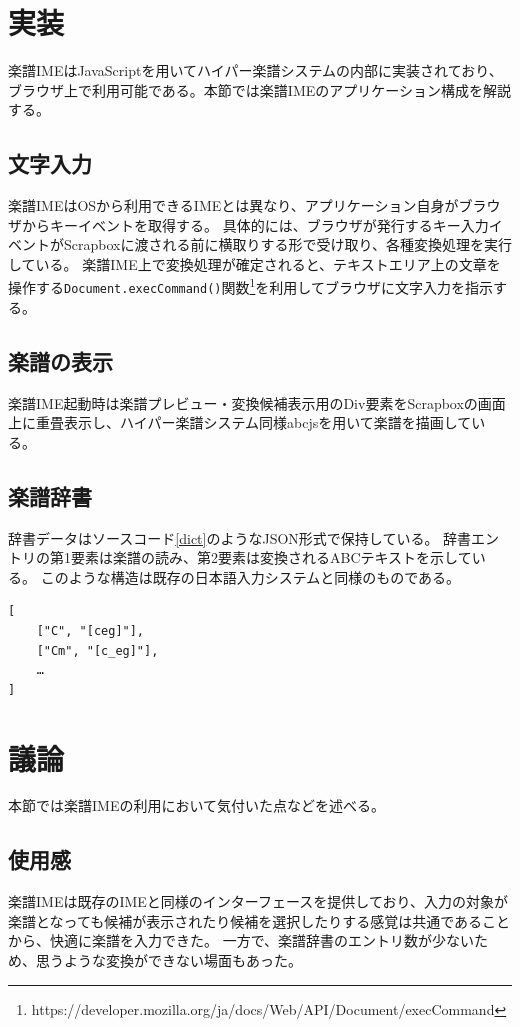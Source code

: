 \section{実装}
楽譜IMEはJavaScriptを用いてハイパー楽譜システムの内部に実装されており、ブラウザ上で利用可能である。本節では楽譜IMEのアプリケーション構成を解説する。

\subsection{文字入力}
楽譜IMEはOSから利用できるIMEとは異なり、アプリケーション自身がブラウザからキーイベントを取得する。
具体的には、ブラウザが発行するキー入力イベントがScrapboxに渡される前に横取りする形で受け取り、各種変換処理を実行している。
楽譜IME上で変換処理が確定されると、テキストエリア上の文章を操作する\texttt{Document.execCommand()}関数\footnote{\textsf{https://developer.mozilla.org/ja/docs/Web/API/Document/execCommand}}を利用してブラウザに文字入力を指示する。

\subsection{楽譜の表示}
楽譜IME起動時は楽譜プレビュー・変換候補表示用のDiv要素をScrapboxの画面上に重畳表示し、ハイパー楽譜システム同様abcjsを用いて楽譜を描画している。

\subsection{楽譜辞書}
辞書データはソースコード\ref{dict}のようなJSON形式で保持している。
辞書エントリの第1要素は楽譜の読み、第2要素は変換されるABCテキストを示している。
このような構造は既存の日本語入力システム\cite{Masui}と同様のものである。
\begin{lstlisting}[caption=楽譜IMEの辞書データ, label=dict]
[
    ["C", "[ceg]"],
    ["Cm", "[c_eg]"],
    …
]
\end{lstlisting}


\section{議論}
本節では楽譜IMEの利用において気付いた点などを述べる。
\subsection{使用感}
楽譜IMEは既存のIMEと同様のインターフェースを提供しており、入力の対象が楽譜となっても候補が表示されたり候補を選択したりする感覚は共通であることから、快適に楽譜を入力できた。
一方で、楽譜辞書のエントリ数が少ないため、思うような変換ができない場面もあった。

